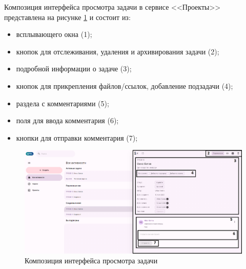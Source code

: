 Композиция интерфейса просмотра задачи в сервисе <<Проекты>> представлена на рисунке \ref{templ:image7d} и состоит из:
\begin{itemize}
  \item всплывающего окна (1);
  \item кнопок для отслеживания, удаления и архивирования задачи (2);
  \item подробной информации о задаче (3);
  \item кнопок для прикрепления файлов/ссылок, добавление подзадачи (4);
  \item раздела с комментариями (5);
  \item поля для ввода комментария (6);
  \item кнопки для отправки комментария (7);
\end{itemize}
\begin{figure}[H]
	\centering
	\includegraphics[width=1\linewidth]{images/проекты4}
	\caption{Композиция интерфейса просмотра задачи}
	\label{templ:image7d}
\end{figure}

